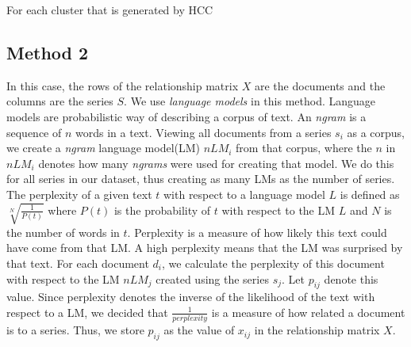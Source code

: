 \documentclass[11pt,twocolumn]{article}
\begin{document}
For each cluster that is generated by HCC

\subsection{Method 2}
In this case, the rows of the relationship matrix $X$ are the documents and the columns are the series $S$.
We use \emph{language models} in this method.
Language models are probabilistic way of describing a corpus of text. An \emph{ngram} is a sequence of $n$ words in a text.
Viewing all documents from a series $s_i$ as a corpus, we create a \emph{ngram} language model(LM) $nLM_i$ from that corpus, where the $n$ in $nLM_i$ denotes how many \emph{ngrams} were used for creating that model. We do this for all series in our dataset, thus creating as many LMs as the number of series.
The perplexity of a given text $t$ with respect to a language model $L$ is defined as $\sqrt[N]{\frac{1}{P(t)}}$ where $P(t)$ is the probability of $t$ with respect to the LM $L$ and $N$ is the number of words in $t$. Perplexity is a measure of how likely this text could have come from that LM. A high perplexity means that the LM was surprised by that text.
For each document $d_i$, we calculate the perplexity of this document with respect to the LM $nLM_j$ created using the series $s_j$. Let $p_{ij}$ denote this value.
Since perplexity denotes the inverse of the likelihood of the text with respect to a LM, we decided that $\frac{1}{perplexity}$ is a measure of how related a document is to a series. Thus, we store $p_{ij}$ as the value of $x_{ij}$ in the relationship matrix $X$.
\end{document}
